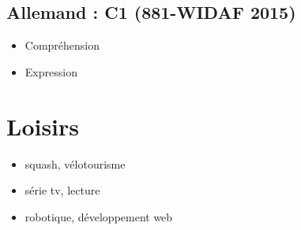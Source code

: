 \documentclass[10pt,a4paper,sans]{article}
\begin{document}
\begin{minipage}[t]{0.25\textwidth}
\begin{mdframed}[style=cadreCompetences]
        \subsection{Allemand : C1 (881-WIDAF 2015)}
            \begin{itemize}
                \item{Compréhension}
                \item{Expression}
            \end{itemize}

        \section{Loisirs}
            \begin{itemize}
                \item{squash, vélotourisme}
                \item{série tv, lecture}
                \item{robotique, développement web}
            \end{itemize}
    \end{mdframed}
\end{minipage}
\hfill
\end{document}
